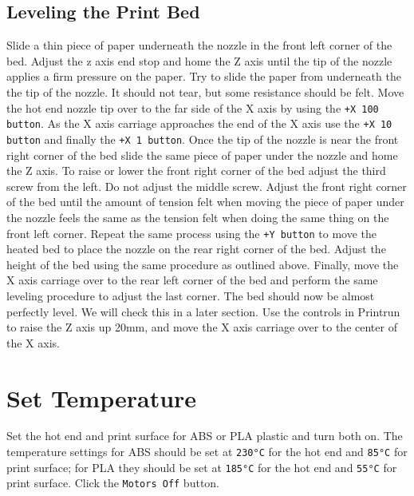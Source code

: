 \subsection{Leveling the Print Bed}
Slide a thin piece of paper underneath the nozzle in the front left corner of the bed. Adjust the z axis end stop and home the Z axis until the tip of the nozzle applies a firm pressure on the paper. Try to slide the paper from underneath the the tip of the nozzle. It should not tear, but some resistance should be felt. Move the hot end nozzle tip over to the far side of the X axis by using the \texttt{+X 100 button}. As the X axis carriage approaches the end of the X axis use the \texttt{+X 10 button} and finally the \texttt{+X 1 button}. Once the tip of the nozzle is near the front right corner of the bed slide the same piece of paper under the nozzle and home the Z axis. To raise or lower the front right corner of the bed adjust the third screw from the left. Do not adjust the middle screw. Adjust the front right corner of the bed until the amount of tension felt when moving the piece of paper under the nozzle feels the same as the tension felt when doing the same thing on the front left corner. Repeat the same process using the \texttt{+Y button} to move the heated bed to place the nozzle on the rear right corner of the bed. Adjust the height of the bed using the same procedure as outlined above. Finally, move the X axis carriage over to the rear left corner of the bed and perform the same leveling procedure to adjust the last corner. The bed should now be almost perfectly level. We will check this in a later section. Use the controls in Printrun to raise the Z axis up 20mm, and move the X axis carriage over to the center of the X axis.

\section{Set Temperature}
Set the hot end and print surface for ABS or PLA plastic and turn both on. The temperature settings for ABS should be set at \texttt{230°C} for the hot end and \texttt{85°C} for print surface; for PLA they should be set at \texttt{185°C} for the hot end and \texttt{55°C} for print surface. Click the \texttt{Motors Off} button.
